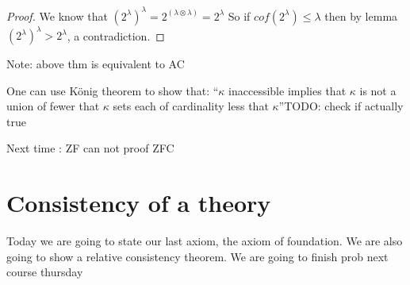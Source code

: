 \begin{proof}
    We know that $(2^\lambda)^\lambda = 2^{(\lambda\otimes \lambda)} = 2^\lambda$
    So if $cof(2^\lambda)\leq \lambda$ then by lemma $(2^\lambda)^\lambda>2^\lambda$, a contradiction.
\end{proof}
Note: above thm is equivalent to AC

One can use König theorem to show that:
``$\kappa$ inaccessible implies that $\kappa$ is not a union of fewer that $\kappa$ sets each of cardinality less that $\kappa$''TODO: check if actually true

Next time : ZF can not proof ZFC
\section{Consistency of a theory}
Today we are going to state our last axiom, the axiom of foundation. We are also going to show a relative consistency theorem.
We are going to finish prob next course thursday

